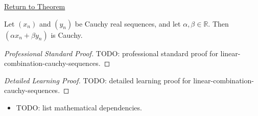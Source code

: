 \newpage
{}
\label{prf:linear-combination-cauchy-sequences}

\begin{remark*}[Return]
\hyperref[thm:linear-combination-cauchy-sequences]{Return to Theorem}
\end{remark*}

\begin{theorem*}
Let $(x_n)$ and $(y_n)$ be Cauchy real sequences, and let
$\alpha,\beta\in\mathbb{R}$. Then $(\alpha x_n+\beta y_n)$ is Cauchy.

\smallskip
\noindent
\end{theorem*}

\begin{proof}[Professional Standard Proof]
\LRAProofBodyStart
TODO: professional standard proof for linear-combination-cauchy-sequences.
\end{proof}

\begin{proof}[Detailed Learning Proof]
\LRAProofBodyStart
TODO: detailed learning proof for linear-combination-cauchy-sequences.
\end{proof}

\begin{remark*}
\end{remark*}

\begin{dependencies}
\begin{itemize}
  \item TODO: list mathematical dependencies.
\end{itemize}
\end{dependencies}

\clearpage
